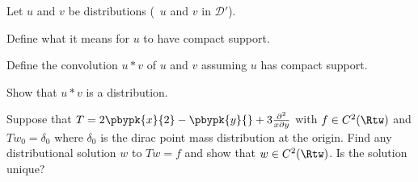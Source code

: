 Let $u$ and $v$ be distributions (\ie\ $u$ and $v$ in $\mathcal{D}'$).
\begin{alist}
\item Define what it means for $u$ to have compact support.
\item Define the convolution $u\ast v$ of $u$ and $v$ assuming $u$ has
compact support.
\item Show that $u \ast v$ is a distribution.
\item Suppose that $T=2
\pbypk{x}{2}-\pbypk{y}{}+3\frac{\partial^2}{x\partial y}$ with $f\in
C^2(\Rtw)$ and $T w_0=\delta_0$ where $\delta_0$ is the dirac point
mass distribution at the origin. Find any distributional solution $w$
to $Tw=f$ and show that $w\in C^2(\Rtw)$. Is the solution unique?
\end{alist}
